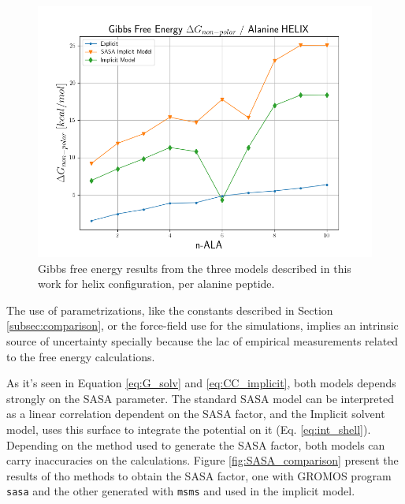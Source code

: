 \begin{figure}[h]
    \centering
    \includegraphics[scale=0.65]{Figures/Chapter_6/comparison_helix.png}
    \caption{Gibbs free energy results from the three models described in this work for helix configuration, per alanine peptide.}
    \label{fig:helix_comparison}
\end{figure}


The use of parametrizations, like the constants described in Section \ref{subsec:comparison}, or the force-field use for the simulations, implies an intrinsic source of uncertainty specially because the lac of empirical measurements related to the free energy calculations. 

As it's seen in Equation \ref{eq:G_solv} and \ref{eq:CC_implicit}, both models depends strongly on the SASA parameter. The standard SASA model can be interpreted as a linear correlation dependent on the SASA factor, and the Implicit solvent model, uses this surface to integrate the potential on it (Eq. \ref{eq:int_shell}). Depending on the method used to generate the SASA factor, both models can carry inaccuracies on the calculations. Figure \ref{fig:SASA_comparison} present the results of tho methods to obtain the SASA factor, one with GROMOS program \texttt{sasa} and the other generated with \texttt{msms} and used in the implicit model.

